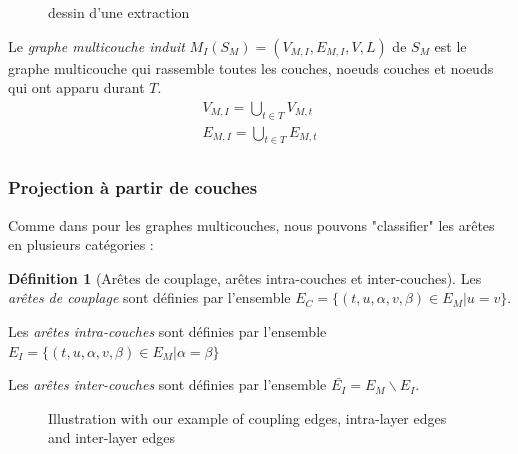 \documentclass[11pt,a4paper]{article}
\theoremstyle{definition}
\newtheorem{defn}{Définition}
\theoremstyle{remark}
\theoremstyle{remark}
\begin{document}
	\begin{figure}[h]
		\begin{minipage}{0.49\linewidth}
		\end{minipage}
		\begin{minipage}{0.49\linewidth}
		\end{minipage}
		\caption{dessin d'une extraction}
	\end{figure}

    
    Le {\em graphe multicouche induit} $M_I(S_M) = (V_{M,I}, E_{M,I}, V,L)$ de $S_M$ est le graphe multicouche qui rassemble toutes les couches, noeuds couches et noeuds qui ont apparu durant $T$.
    \begin{align*}
    	V_{M,I} = \bigcup_{t\in T} V_{M,t}\\
    	E_{M,I} = \bigcup_{t\in T} E_{M,t}\\
    \end{align*}
    
	


\subsubsection{Projection à partir de couches}
Comme dans \cite{mlkiv} pour les graphes multicouches, nous pouvons "classifier" les arêtes en plusieurs catégories :
	
	\begin{defn}[Arêtes de couplage, arêtes intra-couches et inter-couches]

   	Les {\em arêtes de couplage} sont définies par l'ensemble $E_C=\{(t,u,\alpha,v,\beta)\in E_M | u=v\}$.

    Les {\em arêtes intra-couches} sont définies par l'ensemble $E_I = \{(t,u,\alpha,v,\beta) \in E_M | \alpha = \beta \}$

    Les {\em arêtes inter-couches} sont définies par l'ensemble $\bar{E_I} = E_M\backslash E_I$.
    
	
	\end{defn}	
	
	\begin{figure}[h]
		\centering
		\caption{Illustration with our example of coupling edges, intra-layer edges and inter-layer edges}
		\label{exIntraInter}
	\end{figure}
	
\end{document}
